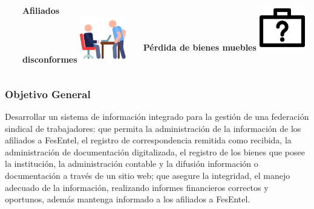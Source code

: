 \documentclass[xcolor=dvipsnames]{beamer}
\begin{document}
\begin{frame}
\begin{columns}
\begin{column}{0.3\textwidth}
      \end{column}
      \begin{column}{0.3\textwidth}
        \centering\textbf{\textcolor{color3}{\small Afiliados\\disconformes}\vspace{3mm}}
        \vspace{10mm}
        \includegraphics[width=20mm]{032-anger}
      \end{column}
      \begin{column}{0.3\textwidth}
        \centering\textbf{\textcolor{color3}{\small Pérdida de bienes muebles}\vspace{3mm}}
        \vspace{10mm}
        \includegraphics[width=20mm]{029-lost-items}
      \end{column}      
    \end{columns}
\end{frame}

\begin{frame}
    \frametitle{Objetivo General}
 
  \centering\large Desarrollar un sistema de información integrado para la gestión de una federación
sindical de trabajadores: que permita la administración de la información de
los afiliados a FesEntel, el registro de correspondencia remitida como recibida,
la administración de documentación digitalizada, el registro de los bienes
que posee la institución, la administración contable y la difusión información
o documentación a través de un sitio web; que asegure la integridad, el
manejo adecuado de la información, realizando informes financieros correctos
y oportunos, además mantenga informado a los afiliados a FesEntel.

\end{frame}
\end{document}
